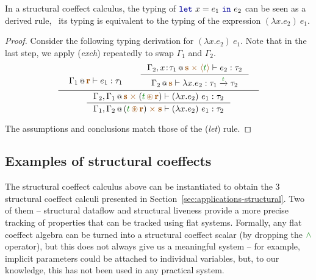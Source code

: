 \begin{remark}
\label{thm:structural-letbinding}
In a structural coeffect calculus, the typing of $\kvd{let}~x=e_1~\kvd{in}~e_2$ can be
seen as a derived rule, \ie~its typing is equivalent to the typing of the expression
$(\lambda x.e_2)~e_1$.

\end{remark}
\begin{proof}
Consider the following typing derivation for $(\lambda x.e_2)~e_1$. Note that
in the last step, we apply (\emph{exch}) repeatedly to swap $\Gamma_1$ and $\Gamma_2$.
%
\begin{equation*}
\inference
  { \begin{array}{l}\coctx{\Gamma_1}{\aclrd{\textbf{r}}} \vdash e_1 : \tau_1\vspace{-1.6em}\end{array} &
    \inference
      { \coctx{\Gamma_2, x\!:\!\tau_1}{\aclrd{\textbf{s}}\;\atimes\;\alift{\cclrd{t}}} \vdash e_2 : \tau_2 }
      { \coctx{\Gamma_2}{\aclrd{\textbf{s}}} \vdash \lambda x.e_2 : \tau_1 \xrightarrow{\cclrd{t}} \tau_2} \vspace{0.2em} }
  { \inference
      { \coctx{\Gamma_2, \Gamma_1}{\aclrd{\textbf{s}} \;\atimes\; (\cclrd{t} \,\aseq\, \aclrd{\textbf{r}})} \vdash (\lambda x.e_2)~e_1 : \tau_2 }
      { \coctx{\Gamma_1, \Gamma_2}{(\cclrd{t} \,\aseq\, \aclrd{\textbf{r}}) \;\atimes\;  \aclrd{\textbf{s}} } \vdash (\lambda x.e_2)~e_1 : \tau_2 } }
\end{equation*}

\noindent
The assumptions and conclusions match those of the (\emph{let}) rule.
\end{proof}



\subsection{Examples of structural coeffects}

The structural coeffect calculus above can be instantiated to obtain the 3 structural coeffect calculi
presented in Section~\ref{sec:applications-structural}. Two of them -- structural dataflow and
structural liveness provide a more precise tracking of properties that can be tracked using
flat systems. Formally, any flat coeffect algebra can be turned into a structural coeffect scalar
(by dropping the $\czip$ operator), but this does not always give us a meaningful system -- for
example, implicit parameters could be attached to individual variables, but, to our knowledge, this
has not been used in any practical system.

